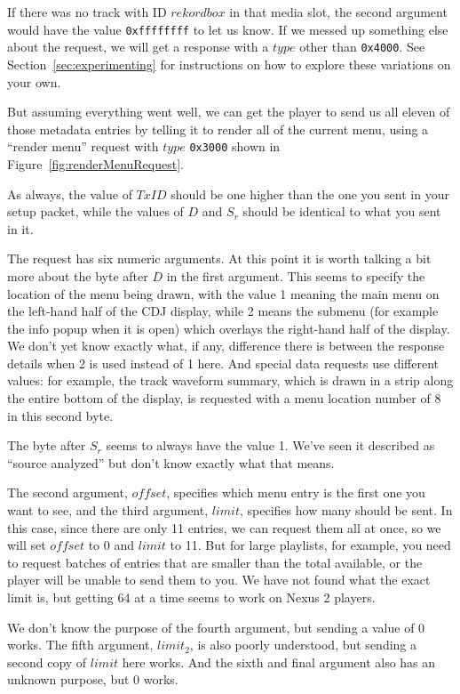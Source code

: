 \documentclass[11pt]{article}
\begin{document}
If there was no track with ID $rekordbox$ in that media slot, the
second argument would have the value {\tt 0xffffffff} to let us know.
If we messed up something else about the request, we will get a
response with a $type$ other than {\tt 0x4000}. See
Section~\ref{sec:experimenting} for instructions on how to explore
these variations on your own.

But assuming everything went well, we can get the player to send us
all eleven of those metadata entries by telling it to render all of
the current menu, using a ``render menu'' request with $type$ {\tt 0x3000} shown in
Figure~\ref{fig:renderMenuRequest}.

As always, the value of $TxID$ should be one higher than the one you
sent in your setup packet, while the values of $D$ and $S_r$ should be
identical to what you sent in it.

The request has six numeric arguments. At this point it is worth
talking a bit more about the byte after $D$ in the first argument.
This seems to specify the location of the menu being drawn, with the
value 1 meaning the main menu on the left-hand half of the CDJ
display, while 2 means the submenu (for example the info popup when it
is open) which overlays the right-hand half of the display. We don't
yet know exactly what, if any, difference there is between the
response details when 2 is used instead of 1 here. And special data
requests use different values: for example, the track waveform
summary, which is drawn in a strip along the entire bottom of the
display, is requested with a menu location number of 8 in this second
byte.

The byte after $S_r$ seems to always have the value 1. We've seen it
described as ``source analyzed'' but don't know exactly what that
means.

The second argument, $offset$, specifies which menu entry is the first
one you want to see, and the third argument, $limit$, specifies how
many should be sent. In this case, since there are only 11 entries, we
can request them all at once, so we will set $offset$ to 0 and $limit$
to 11. But for large playlists, for example, you need to request
batches of entries that are smaller than the total available, or the
player will be unable to send them to you. We have not found what the
exact limit is, but getting 64 at a time seems to work on Nexus 2
players.

We don't know the purpose of the fourth argument, but sending a value
of 0 works. The fifth argument, $limit_2$, is also poorly understood,
but sending a second copy of $limit$ here works. And the sixth and
final argument also has an unknown purpose, but 0 works.
\end{document}
